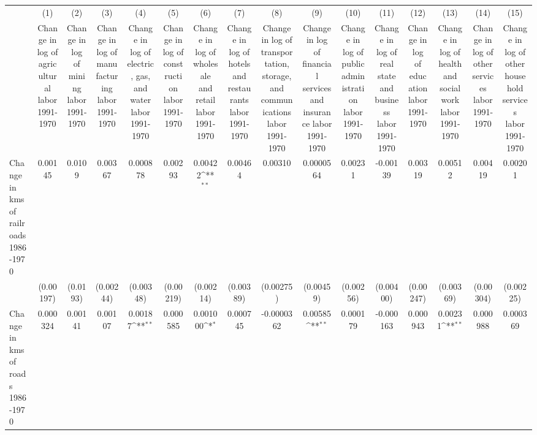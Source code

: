 {
\def\sym#1{\ifmmode^{#1}\else\(^{#1}\)\fi}
\begin{tabular}{l*{15}{c}}
\hline\hline
                &\multicolumn{1}{c}{(1)}&\multicolumn{1}{c}{(2)}&\multicolumn{1}{c}{(3)}&\multicolumn{1}{c}{(4)}&\multicolumn{1}{c}{(5)}&\multicolumn{1}{c}{(6)}&\multicolumn{1}{c}{(7)}&\multicolumn{1}{c}{(8)}&\multicolumn{1}{c}{(9)}&\multicolumn{1}{c}{(10)}&\multicolumn{1}{c}{(11)}&\multicolumn{1}{c}{(12)}&\multicolumn{1}{c}{(13)}&\multicolumn{1}{c}{(14)}&\multicolumn{1}{c}{(15)}\\
                &\multicolumn{1}{c}{Change in log of agricultural labor 1991-1970}&\multicolumn{1}{c}{Change in log of mining labor 1991-1970}&\multicolumn{1}{c}{Change in log of manufacturing labor 1991-1970}&\multicolumn{1}{c}{Change in log of electric, gas, and water labor 1991-1970}&\multicolumn{1}{c}{Change in log of construction labor 1991-1970}&\multicolumn{1}{c}{Change in log of wholesale and retail labor 1991-1970}&\multicolumn{1}{c}{Change in log of hotels and restaurants labor 1991-1970}&\multicolumn{1}{c}{Change in log of transportation, storage, and communications labor 1991-1970}&\multicolumn{1}{c}{Change in log of financial services and insurance labor 1991-1970}&\multicolumn{1}{c}{Change in log of public administration labor 1991-1970}&\multicolumn{1}{c}{Change in log of real state and business labor 1991-1970}&\multicolumn{1}{c}{Change in log of education labor 1991-1970}&\multicolumn{1}{c}{Change in log of health and social work labor 1991-1970}&\multicolumn{1}{c}{Change in log of other services labor 1991-1970}&\multicolumn{1}{c}{Change in log of other household services labor 1991-1970}\\
\hline
Change in kms of railroads 1986-1970&  0.00145         &   0.0109         &  0.00367         & 0.000878         &  0.00293         &  0.00422\sym{**} &  0.00464         &  0.00310         &0.0000564         &  0.00231         & -0.00139         &  0.00319         &  0.00512         &  0.00419         &  0.00201         \\
                &(0.00197)         & (0.0193)         &(0.00244)         &(0.00348)         &(0.00219)         &(0.00214)         &(0.00389)         &(0.00275)         &(0.00459)         &(0.00256)         &(0.00400)         &(0.00247)         &(0.00369)         &(0.00304)         &(0.00225)         \\
[1em]
Change in kms of roads 1986-1970& 0.000324         &  0.00141         &  0.00107         &  0.00187\sym{**} & 0.000585         & 0.001000\sym{*}  & 0.000745         &-0.0000362         &  0.00585\sym{**} & 0.000179         &-0.000163         & 0.000943         &  0.00231\sym{**} & 0.000988         & 0.000369         \\

\end{tabular}}
